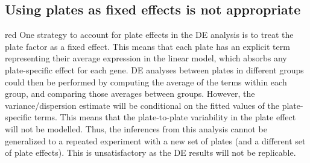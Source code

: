\documentclass{article}
\begin{document}
\subsection{Using plates as fixed effects is not appropriate}
\begin{color}{red}
One strategy to account for plate effects in the DE analysis is to treat the plate factor as a fixed effect.
This means that each plate has an explicit term representing their average expression in the linear model, which absorbs any plate-specific effect for each gene.
DE analyses between plates in different groups could then be performed by computing the average of the terms within each group, and comparing those averages between groups.
However, the variance/dispersion estimate will be conditional on the fitted values of the plate-specific terms.
This means that the plate-to-plate variability in the plate effect will not be modelled.
Thus, the inferences from this analysis cannot be generalized to a repeated experiment with a new set of plates (and a different set of plate effects).
This is unsatisfactory as the DE results will not be replicable.
\end{color}
\end{document}
